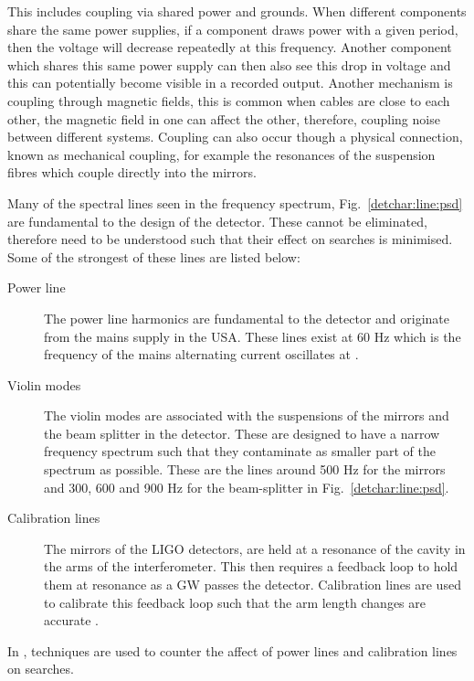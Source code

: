 This includes coupling via shared power and grounds. 
When different components share the same power supplies, if a component draws power with a given period, then the voltage will decrease repeatedly at this frequency. 
Another component which shares this same power supply can then also see this drop in voltage and this can potentially become visible in a recorded output. 
Another mechanism is coupling through magnetic fields, this is common when cables are close to each other, the magnetic field in one can affect the other, therefore, coupling noise between different systems.
Coupling can also occur though a physical connection, known as mechanical coupling, for example the resonances of the suspension fibres which couple directly into the mirrors.

%

Many of the spectral lines seen in the frequency spectrum, Fig.~\ref{detchar:line:psd} are fundamental to the design of the detector. 
These cannot be eliminated, therefore need to be understood such that their effect on searches is minimised.
Some of the strongest of these lines are listed below:
\begin{description}
	\item[Power line] The power line harmonics are fundamental to the detector and originate from the mains supply in the USA. These lines exist at 60 Hz which is the frequency of the mains alternating current oscillates at \citep{aasi2015CharacterizationLIGO}.
	
	\item[Violin modes] The violin modes are associated with the suspensions of the mirrors and the beam splitter in the detector. These are designed to have a narrow frequency spectrum such that they contaminate as smaller part of the spectrum as possible. These are the lines around 500 Hz for the mirrors and 300, 600 and 900 Hz for the beam-splitter \citep{GWOpen} in Fig.~\ref{detchar:line:psd}.
	
	\item[Calibration lines] The mirrors of the \gls{LIGO} detectors, are held at a resonance of the cavity in the arms of the interferometer. This then requires a feedback loop to hold them at resonance as a \gls{GW} passes the detector. Calibration lines are used to calibrate this feedback loop such that the arm length changes are accurate \citep{tuyenbayev2016ImprovingLIGO,coughlin2010NoiseLine}.
\end{description}
In \citep{davis2019ImprovingSensitivity}, techniques are used to counter the affect of power lines and calibration lines on searches. 

